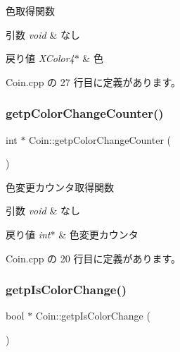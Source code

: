 色取得関数 


\begin{DoxyParams}{引数}
{\em void} & なし \\
\hline
\end{DoxyParams}

\begin{DoxyRetVals}{戻り値}
{\em X\+Color4$\ast$} & 色 \\
\hline
\end{DoxyRetVals}


 Coin.\+cpp の 27 行目に定義があります。

\mbox{\label{class_coin_a968709417a7ccf16ec90cdc57d0d8582}} 
\subsubsection{\texorpdfstring{getp\+Color\+Change\+Counter()}{getpColorChangeCounter()}}
{\footnotesize\ttfamily int $\ast$ Coin\+::getp\+Color\+Change\+Counter (\begin{DoxyParamCaption}{ }\end{DoxyParamCaption})}



色変更カウンタ取得関数 


\begin{DoxyParams}{引数}
{\em void} & なし \\
\hline
\end{DoxyParams}

\begin{DoxyRetVals}{戻り値}
{\em int$\ast$} & 色変更カウンタ \\
\hline
\end{DoxyRetVals}


 Coin.\+cpp の 20 行目に定義があります。

\mbox{\label{class_coin_a6354f3bc595e0fc93c28d8e5c43b5e39}} 
\subsubsection{\texorpdfstring{getp\+Is\+Color\+Change()}{getpIsColorChange()}}
{\footnotesize\ttfamily bool $\ast$ Coin\+::getp\+Is\+Color\+Change (\begin{DoxyParamCaption}{ }\end{DoxyParamCaption})}



